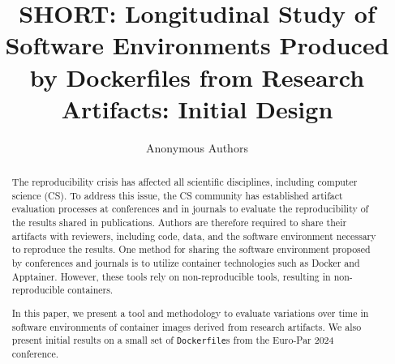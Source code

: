 \documentclass[sigconf,natbib=false]{acmart}
\newcommand{\df}{\texttt{Dockerfile}}
\begin{document}
\title{%
  SHORT: Longitudinal Study of Software Environments Produced by Dockerfiles from Research Artifacts: Initial Design%
}


% 
% 

\author{Anonymous Authors}



\begin{abstract}
  The reproducibility crisis has affected all scientific disciplines, including computer science (CS).
  To address this issue, the CS community has established artifact evaluation processes at conferences and in journals to evaluate the reproducibility of the results shared in publications.
  Authors are therefore required to share their artifacts with reviewers, including code, data, and the software environment necessary to reproduce the results.
  One method for sharing the software environment proposed by conferences and journals is to utilize container technologies such as Docker and Apptainer.
  However, these tools rely on non-reproducible tools, resulting in non-reproducible containers.

  In this paper, we present a tool and methodology to evaluate variations over time in software environments of container images derived from research artifacts.
  We also present initial results on a small set of \df s from the Euro-Par 2024 conference.
 
\end{abstract}
\end{document}
